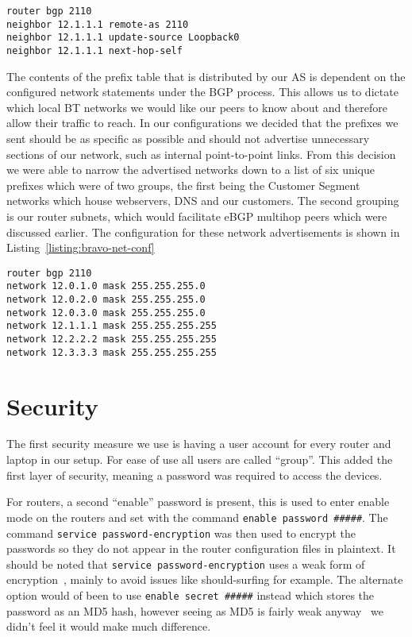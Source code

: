 \begin{lstlisting}[caption={Bravo-Alpha iBGP Configuration}, label={listing:bravo-ibgp-conf}]
router bgp 2110
neighbor 12.1.1.1 remote-as 2110
neighbor 12.1.1.1 update-source Loopback0
neighbor 12.1.1.1 next-hop-self
\end{lstlisting}

The contents of the prefix table that is distributed by our AS is dependent on
the configured network statements under the BGP process. This allows us to
dictate which local BT networks we would like our peers to know about and
therefore allow their traffic to reach. In our configurations we decided that
the prefixes we sent should be as specific as possible and should not advertise
unnecessary sections of our network, such as internal point-to-point links. From
this decision we were able to narrow the advertised networks down to a list of
six unique prefixes which were of two groups, the first being the Customer
Segment networks which house webservers, DNS and our customers. The second
grouping is our router subnets, which would facilitate eBGP multihop peers which
were discussed earlier. The configuration for these network advertisements is
shown in Listing~\ref{listing:bravo-net-conf}

\begin{lstlisting}[caption={Bravo BGP Network Configuration}, label={listing:bravo-net-conf}]
router bgp 2110
network 12.0.1.0 mask 255.255.255.0
network 12.0.2.0 mask 255.255.255.0
network 12.0.3.0 mask 255.255.255.0
network 12.1.1.1 mask 255.255.255.255
network 12.2.2.2 mask 255.255.255.255
network 12.3.3.3 mask 255.255.255.255
\end{lstlisting}

\section{Security}
The first security measure we use is having a user account for every router and
laptop in our setup. For ease of use all users are called ``group''. This added
the first layer of security,  meaning a password was required to access the
devices.

For routers, a second ``enable'' password is present, this is used to enter
enable mode on the routers and set with the command \texttt{enable password
\#\#\#\#\#}. The command \texttt{service password-encryption} was then used to
encrypt the passwords so they do not appear in the router configuration files
in plaintext. It should be noted that \texttt{service password-encryption} uses
a weak form of encryption~\cite{ciscocracker}, mainly to avoid issues like
should-surfing for example. The alternate option would of been to use
\texttt{enable secret \#\#\#\#\#} instead which stores the password as an MD5
hash, however seeing as MD5 is fairly weak anyway~\cite{md5} we didn't feel it
would make much difference.

